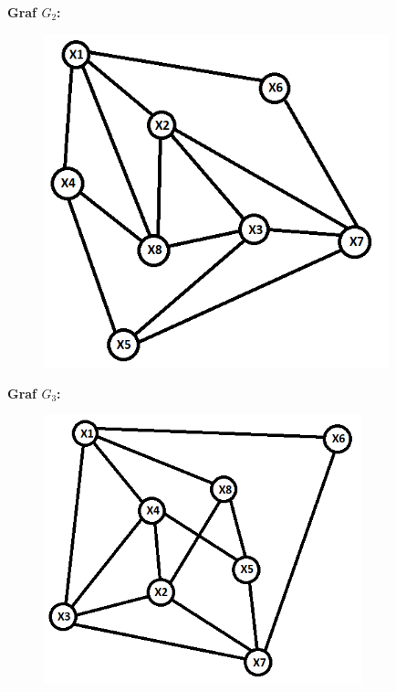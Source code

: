 \documentclass[12pt]{article}
\begin{document}
\begin{enumerate}
\begin{center}
\newpage

    \textbf{Graf $G_2$: }
   
   \begin{figure}[htp]
    \centering
    \includegraphics[width=10cm]{GRAF2.png}
\end{figure}

    \textbf{Graf $G_3$: }
    
   \begin{figure}[htp]
    \centering
    \includegraphics[width=9.2cm]{GRAF3.png}
\end{figure}


\end{center}
\end{enumerate}
\end{document}
